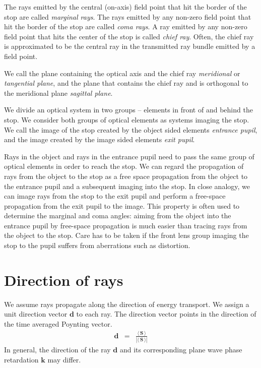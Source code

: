 \documentclass[12pt,a4paper,twoside,openright,BCOR10mm,headsepline,titlepage,abstracton,chapterprefix,final]{scrreprt}
\newcommand\Vector[1]{{\mathbf{#1}}}
\newcommand{\timeavg}[1]{{\langle\,#1\,\rangle}}
\begin{document}
The rays emitted by the central (on-axis) field point that hit the border of the stop are called \emph{marginal rays}.
The rays emitted by any non-zero field point that hit the border of the stop are called \emph{coma rays}.
A ray emitted by any non-zero field point that hits the center of the stop is called \emph{chief ray}.
Often, the chief ray is approximated to be the central ray in the transmitted ray bundle emitted by a field point.

We call the plane containing the optical axis and the chief ray \emph{meridional} or \emph{tangential plane}, 
and the plane that contains the chief ray and is orthogonal to the meridional plane \emph{sagittal plane}.

We divide an optical system in two groups -- elements in front of and behind the stop. 
We consider both groups of optical elements as systems imaging the stop.
We call the image of the stop created by the object sided elements \emph{entrance pupil}, and the image created by the image sided elements \emph{exit pupil}.

Rays in the object and rays in the entrance pupil need to pass the same group of optical elements in order to reach the stop. 
We can regard the propagation of rays from the object to the stop as a free space propagation from the object to the entrance pupil and a subsequent imaging into the stop.
In close analogy, we can image rays from the stop to the exit pupil and perform a free-space propagation from the exit pupil to the image.
This property is often used to determine the marginal and coma angles: 
aiming from the object into the entrance pupil by free-space propagation is much easier than tracing rays from the object to the stop.
Care has to be taken if the front lens group imaging the stop to the pupil suffers from aberrations such as distortion.



\section{Direction of rays}
We assume rays propagate along the direction of energy transport.
We assign a unit direction vector $\Vector{d}$ to each ray.
The direction vector points in the direction of the time averaged Poynting vector.
\begin{eqnarray}
 \Vector{d} &=& \frac{\timeavg{\Vector{S}}}{|\timeavg{\Vector{S}}|}
\end{eqnarray}
In general, the direction of the ray $\Vector{d}$ and its corresponding plane wave phase retardation $\Vector{k}$ may differ.
\end{document}
